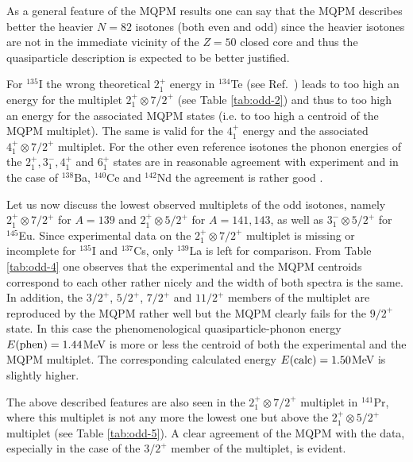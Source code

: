 As a general feature of the MQPM results one can say that the MQPM
describes better the heavier $N=82$ 
isotones (both even \cite{HOL97} and
odd) since the heavier isotones are not in the immediate vicinity of
the $Z=50$ closed core and thus the quasiparticle description is 
expected to be better justified.

For $^{135}$I the wrong theoretical $2_1^+$ 
energy in $^{134}$Te (see
Ref.\ \cite{HOL97}) leads to too high an energy for the multiplet
$2^+_1\otimes 7/2^+$ (see Table \ref{tab:odd-2}) 
and thus to too high an energy for
the associated MQPM states (i.e. to too high a centroid of the MQPM 
multiplet). The same is valid for the $4^+_1$ energy and the associated
$4^+_1\otimes 7/2^+$ multiplet. For the
other even reference isotones the phonon energies of the $2^+_1,3^-_1,
4^+_1$ and $6^+_1$ states are in reasonable agreement with experiment 
and in the case of $^{138}$Ba, $^{140}$Ce and $^{142}$Nd the agreement
is rather good \cite{HOL97}.

Let us now discuss the lowest observed multiplets of the odd isotones,
namely $2^+_1\otimes 7/2^+$ for $A=139$ and $2^+_1\otimes 5/2^+$ 
for $A=141,143$, as well as $3^-_1\otimes 5/2^+$ for $^{145}$Eu. 
Since experimental data on the $2^+_1\otimes 7/2^+$ multiplet
is missing or incomplete for $^{135}$I and $^{137}$Cs,
only $^{139}$La is left for comparison. From
Table \ref{tab:odd-4} one observes that the experimental and the MQPM 
centroids correspond
to each other rather nicely and the width of both spectra is the same.
In addition, the $3/2^+$, $5/2^+$, $7/2^+$ and $11/2^+$ members of the
multiplet are reproduced by the MQPM rather well but the MQPM clearly
fails for the $9/2^+$ state. In this case the phenomenological
quasiparticle-phonon energy $E({\rm phen})=1.44$MeV is more or less
the centroid of both the experimental and the MQPM multiplet. The
corresponding calculated energy $E({\rm calc})=1.50$MeV is slightly
higher.

The above described features are also seen in the $2^+_1\otimes 7/2^+$ 
multiplet in $^{141}$Pr, where this multiplet is not any more the lowest
one but above the $2^+_1\otimes 5/2^+$ multiplet 
(see Table \ref{tab:odd-5}). A clear
agreement of the MQPM with the data, especially
in the case of the $3/2^+$ member of the multiplet, is evident.

